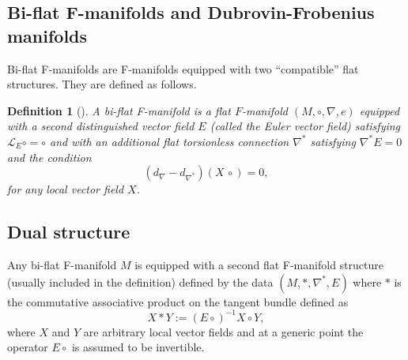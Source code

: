\documentclass[11pt,a4paper]{amsart}
\numberwithin{equation}{section}
\newtheorem{definition}[theorem]{Definition}
\numberwithin{equation}{section}
\begin{document}
\subsection{Bi-flat F-manifolds and Dubrovin-Frobenius manifolds}
Bi-flat F-manifolds are F-manifolds equipped with two ``compatible'' flat structures. They are defined as follows. 
\begin{definition}[\cite{ALjgp,ALmulti}]
A \emph{bi-flat}  F-manifold is a flat $F$-manifold $(M, \circ, \nabla, e)$ equipped with a 
 second distinguished  vector field $E$ (called the \emph{Euler vector field}) satisfying $\mathcal{L}_E \circ=\circ$ and with an additional flat torsionless connection $\nabla^*$ satisfying $\nabla^*E=0$ and the condition
\begin{equation}\label{comp_conn}
(d_{\nabla}-d_{\nabla^{*}})(X\,\circ)=0,
\end{equation}
for any local vector field $X$. 
\end{definition}

\subsection{Dual structure}
Any bi-flat F-manifold $M$ is equipped with a second flat F-manifold structure (usually included in the definition) defined by the data $(M, *, \nabla^*, E)$  where $*$ is the commutative associative product on the tangent bundle defined as 
\begin{equation}\label{dual}
X*Y := (E\circ)^{-1}X\circ Y,
\end{equation}
where $X$ and $Y$ are arbitrary local vector fields and at a generic point the operator $E\circ$ is assumed to be invertible. 
\end{document}
